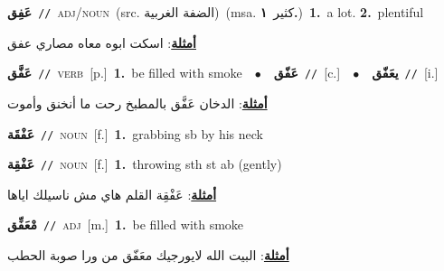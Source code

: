 \documentclass[10pt,a4paper,twoside]{article} %
\begin{document}
\begin{multicols}{2}
{\setlength\topsep{0pt}\textbf{\foreignlanguage{arabic}{عَفِق}}\ {\color{gray}\texttt{//}\color{black}}\ \textsc{adj/noun}\ (src. \color{gray}\foreignlanguage{arabic}{الضفة الغربية}\color{black})\ \color{gray}(msa. \foreignlanguage{arabic}{كثير}~\foreignlanguage{arabic}{\textbf{١.}})\color{black}\ \textbf{1.}~a lot.  \textbf{2.}~plentiful\  \begin{flushright}\color{gray}\foreignlanguage{arabic}{\textbf{\underline{\foreignlanguage{arabic}{أمثلة}}}: اسكت ابوه معاه مصاري عفق}\end{flushright}\color{black}} \vspace{2mm}

{\setlength\topsep{0pt}\textbf{\foreignlanguage{arabic}{عَفَّق}}\ {\color{gray}\texttt{//}\color{black}}\ \textsc{verb}\ [p.]\ \textbf{1.}~be filled with smoke\ \ $\bullet$\ \ \setlength\topsep{0pt}\textbf{\foreignlanguage{arabic}{عَفّق}}\ {\color{gray}\texttt{//}\color{black}}\ [c.]\ \ $\bullet$\ \ \setlength\topsep{0pt}\textbf{\foreignlanguage{arabic}{يعَفّق}}\ {\color{gray}\texttt{//}\color{black}}\ [i.]\  \begin{flushright}\color{gray}\foreignlanguage{arabic}{\textbf{\underline{\foreignlanguage{arabic}{أمثلة}}}: الدخان عَفَّق بالمطبخ رحت ما أنخنق وأموت}\end{flushright}\color{black}} \vspace{2mm}

{\setlength\topsep{0pt}\textbf{\foreignlanguage{arabic}{عَفْقَة}}\ {\color{gray}\texttt{//}\color{black}}\ \textsc{noun}\ [f.]\ \textbf{1.}~grabbing sb by his neck\ } \vspace{2mm}

{\setlength\topsep{0pt}\textbf{\foreignlanguage{arabic}{عَفْقِة}}\ {\color{gray}\texttt{//}\color{black}}\ \textsc{noun}\ [f.]\ \textbf{1.}~throwing sth st ab (gently)\  \begin{flushright}\color{gray}\foreignlanguage{arabic}{\textbf{\underline{\foreignlanguage{arabic}{أمثلة}}}: عَفْقِة القلم هاي مش ناسيلك اياها}\end{flushright}\color{black}} \vspace{2mm}

{\setlength\topsep{0pt}\textbf{\foreignlanguage{arabic}{مْعَفِّق}}\ {\color{gray}\texttt{//}\color{black}}\ \textsc{adj}\ [m.]\ \textbf{1.}~be filled with smoke\  \begin{flushright}\color{gray}\foreignlanguage{arabic}{\textbf{\underline{\foreignlanguage{arabic}{أمثلة}}}: البيت الله لايورجيك معَفّق من ورا  صوبة الحطب}\end{flushright}\color{black}} \vspace{2mm}


\end{multicols}
\end{document}
